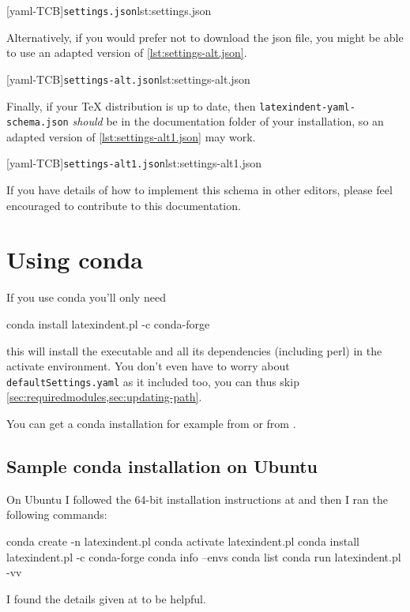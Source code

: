 		\begin{widepage}
			[yaml-TCB]{\texttt{settings.json}}{lst:settings.json}
		\end{widepage}

		Alternatively, if you would prefer not to download the json file, you might be able to
		use an adapted version of \cref{lst:settings-alt.json}.

		\begin{widepage}
			[yaml-TCB]{\texttt{settings-alt.json}}{lst:settings-alt.json}
		\end{widepage}

		Finally, if your TeX distribution is up to date, then
		\texttt{latexindent-yaml-schema.json} \emph{should} be in the documentation folder of
		your installation, so an adapted version of \cref{lst:settings-alt1.json} may work.

		\begin{widepage}
			[yaml-TCB]{\texttt{settings-alt1.json}}{lst:settings-alt1.json}
		\end{widepage}

		If you have details of how to implement this schema in other editors, please feel
		encouraged to contribute to this documentation.

	\section{Using conda}\label{sec:app:conda}
	 If you use conda you'll only need
	 \begin{commandshell}
conda install latexindent.pl -c conda-forge
\end{commandshell}
	 this will install the executable and all its dependencies (including perl) in the
	 activate environment. You don't even have to worry about \texttt{defaultSettings.yaml} as
	 it included too, you can thus skip \cref{sec:requiredmodules,sec:updating-path}.

	 You can get a conda installation for example from \cite{conda} or from \cite{anacoda}.

	\subsection{Sample conda installation on Ubuntu}
		On Ubuntu I followed the 64-bit installation instructions at \cite{condainstallubuntu}
		and then I ran the following commands:
		\begin{commandshell}
conda create -n latexindent.pl
conda activate latexindent.pl
conda install latexindent.pl -c conda-forge
conda info --envs
conda list
conda run latexindent.pl -vv
\end{commandshell}
		I found the details given at \cite{condainstallhelp} to be helpful.

